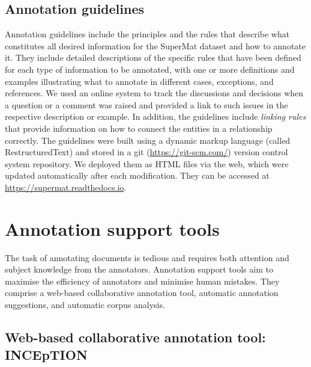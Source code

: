 \subsection{Annotation guidelines}
\label{subsec:annotation-guidelines}
Annotation guidelines include the principles and the rules that describe what constitutes all desired information for the SuperMat dataset and how to annotate it. They include detailed descriptions of the specific rules that have been defined for each type of information to be annotated, with one or more definitions and examples illustrating what to annotate in different cases, exceptions, and references. We used an online system to track the discussions and decisions when a question or a comment was raised and provided a link to such issues in the respective description or example. 
In addition, the guidelines include \textit{linking rules} that provide information on how to connect the entities in a relationship correctly. 
The guidelines were built using a dynamic markup language (called RestructuredText) and stored in a git (\url{https://git-scm.com/}) version control system repository. We deployed them as HTML files via the web, which were updated automatically after each modification. They can be accessed at \url{https://supermat.readthedocs.io}.

\section{Annotation support tools}
\label{subsec:annotation-support-tool}
The task of annotating documents is tedious and requires both attention and subject knowledge from the annotators.
Annotation support tools aim to maximise the efficiency of annotators and minimise human mistakes. 
They comprise a web-based collaborative annotation tool, automatic annotation suggestions, and automatic corpus analysis. 

\subsection{Web-based collaborative annotation tool: INCEpTION}
\label{subsec:annotation-tool}

